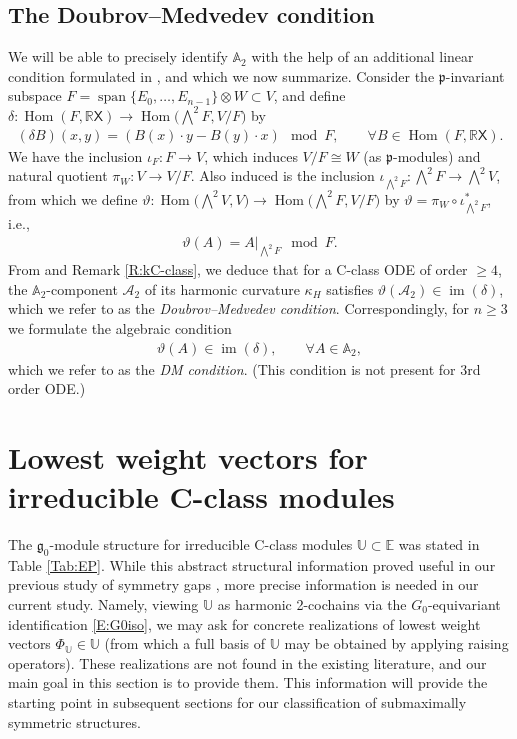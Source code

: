 \documentclass[10pt,a4paper]{amsart}
\newcommand\tensor{\otimes}
\DeclareMathOperator{\img}{im}
\DeclareMathOperator{\sn}{span}
\DeclareMathOperator{\hm}{Hom}
\newcommand\fg{\mathfrak{g}}
\newcommand\fp{\mathfrak{p}}
\newcommand{\R}{\mathbb{R}}
\newcommand\bbE{\mathbb{E}}
\newcommand\bbU{\mathbb{U}}
\newcommand\bbA{\mathbb{A}}
\newcommand\sfX{\mathsf{X}}
\newcommand\cA{\mathcal{A}}
\numberwithin{equation}{section}
\begin{document}
\subsection{The Doubrov--Medvedev condition} \label{S:Ef}

 We will be able to precisely identify $\bbA_2$ with the help of an additional linear condition formulated in \cite[Section~3.1, Proposition~4]{DM2014}, and which we now summarize. Consider the $\fp$-invariant subspace $F=\sn \{E_0,\dots,E_{n-1}\}\tensor W \subset V$, and define $\delta\colon \hm(F,\R\sfX) \to \hm \bigl(\bigwedge^2 F, V/F\bigr)$ by
\begin{align}\label{E:delta}
(\delta B)(x,y)=(B(x)\cdot y -B(y)\cdot x)\mod F, \qquad \forall B \in \hm(F,\R\sfX).
\end{align}
We have the inclusion $\iota_F\colon F \to V$, which induces $V/F \cong W$ (as $\fp$-modules) and natural quotient $\pi_W\colon V \to V/F$. Also induced is the inclusion $\iota_{\bigwedge^2F} \colon \bigwedge^2F \to \bigwedge^2V$, from which we define $\vartheta\colon \hm \bigl(\bigwedge^2V,V\bigr) \to \hm \bigl(\bigwedge^2F,V/F\bigr) $ by $\vartheta = \pi_W \circ \iota_{\bigwedge^2 F}^*$, i.e.,
\begin{align}\label{E:alpha}
\vartheta(A) = \left.A\right|_{\bigwedge^2F} \mod F.
\end{align}
From \cite[Section~3.1, Proposition~4]{DM2014} and Remark \ref{R:kC-class}, we deduce that for a C-class ODE of order $\geq 4$, the $\bbA_2$-component $\cA_2$ of its harmonic curvature $\kappa_H$ satisfies $\vartheta(\cA_2) \in \img(\delta)$, which we refer to as the {\em Doubrov--Medvedev condition}. Correspondingly, for $n \geq 3$ we formulate the algebraic condition
\begin{align}\label{E:ALC}
\vartheta(A) \in \img(\delta), \qquad \forall A \in \bbA_2,
\end{align}
which we refer to as the {\em DM condition}. (This condition is not present for 3rd order ODE.)
 \section{Lowest weight vectors for irreducible C-class modules} \label{S:lwv}

The $\fg_0$-module structure for irreducible C-class modules $\bbU \subset \bbE$ was stated in Table \ref{Tab:EP}. While this abstract structural information proved useful in our previous study of symmetry gaps \cite{KT2021}, more precise information is needed in our current study. Namely, viewing $\bbU$ as harmonic 2-cochains via the $G_0$-equivariant identification \eqref{E:G0iso}, we may ask for concrete realizations of lowest weight vectors $\Phi_\bbU \in \bbU$ (from which a full basis of $\bbU$ may be obtained by applying raising operators). These realizations are not found in the existing literature, and our main goal in this section is to provide them. This information will provide the starting point in subsequent sections for our classification of submaximally symmetric structures.
\end{document}
